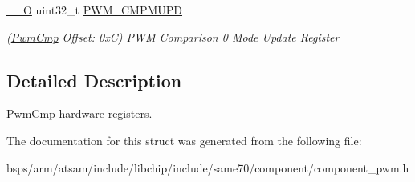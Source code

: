\begin{DoxyCompactItemize}
\mbox{\label{structPwmCmp_a47b8bfca2fac66f3f5103a0bc9a1f550}} 
\mbox{\hyperlink{core__cm7_8h_a7e25d9380f9ef903923964322e71f2f6}{\+\_\+\+\_\+O}} uint32\+\_\+t \mbox{\hyperlink{structPwmCmp_a47b8bfca2fac66f3f5103a0bc9a1f550}{P\+W\+M\+\_\+\+C\+M\+P\+M\+U\+PD}}
\begin{DoxyCompactList}\small\item\em (\mbox{\hyperlink{structPwmCmp}{Pwm\+Cmp}} Offset\+: 0xC) P\+WM Comparison 0 Mode Update Register \end{DoxyCompactList}\end{DoxyCompactItemize}


\subsection{Detailed Description}
\mbox{\hyperlink{structPwmCmp}{Pwm\+Cmp}} hardware registers. 

The documentation for this struct was generated from the following file\+:\begin{DoxyCompactItemize}
\item 
bsps/arm/atsam/include/libchip/include/same70/component/component\+\_\+pwm.\+h\end{DoxyCompactItemize}
